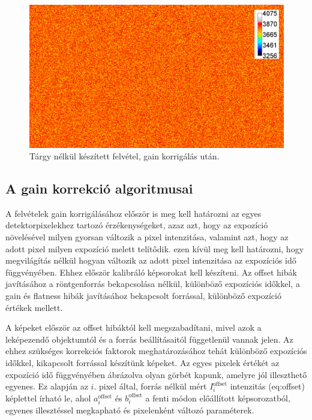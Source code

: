 \documentclass[a4paper,12pt]{article}
\begin{document}
\begin{figure}[htbp]
\center
\includegraphics[width=1.0\textwidth]{abrak/gainnel}
\caption{Tárgy nélkül készített felvétel, gain korrigálás után.}
\label{fig:gainnel}
\end{figure}

\subsection{A gain korrekció algoritmusai}

A felvételek gain korrigálásához először is meg kell határozni az egyes detektorpixelekhez tartozó érzékenységeket, azaz azt, hogy az expozíció növelésével milyen gyorsan változik a pixel intenzitása, valamint azt, hogy az adott pixel milyen expozíció melett telítődik. ezen kívül meg kell határozni, hogy megvilágítás nélkül hogyan változik az adott pixel intenzitása az expozíciós idő függvényében. Ehhez először kalibráló képsorokat kell készíteni. Az offset hibák javításához a röntgenforrás bekapcsolása nélkül, különböző expozíciós időkkel, a gain és flatness hibák javításához bekapcsolt forrással, különböző expozíció értékek mellett. 

A képeket először az offset hibáktól kell megszabadítani, mivel azok a leképezendő objektumtól és a forrás beállításaitól függetlenül vannak jelen. Az ehhez szükséges korrekciós faktorok meghatározásához tehát különböző expozíciós időkkel, kikapcsolt forrással készítünk képeket. Az egyes pixelek értékét az expozíció idő függvényében ábrázolva olyan görbét kapunk, amelyre jól illeszthető egyenes. Ez alapján az $i$. pixel által, forrás nélkül mért $ I_i^{\text{offset}}$ intenzitás \aref({eq:offset}) képlettel írható le, ahol $a_i^{\text{offset}} $ és $b_i^{\text{offset}}$ a fenti módon előállított képsorozatból, egyenes illesztéssel megkapható és pixelenként változó paraméterek.
\end{document}
